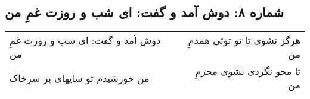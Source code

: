 \begin{center}
\section*{شماره ۸: دوش آمد و گفت: ای شب و روزت غمِ من}
\label{sec:008}
\begin{longtable}{l p{0.5cm} r}
دوش آمد و گفت: ای شب و روزت غمِ من
&&
هرگز نشوی تا تو توئی همدمِ من
\\
من خورشیدم تو سایهای بر سرِخاک
&&
تا محو نگردی نشوی محرَمِ من
\\
\end{longtable}
\end{center}
